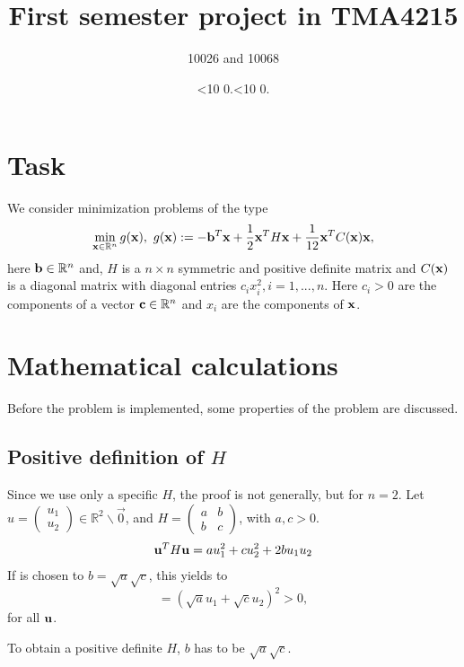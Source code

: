 \documentclass[a4paper,11pt]{article}
\newcommand{\leadingzero}[1]{\ifnum #1<10 0\the#1\else\the#1\fi}
\newcommand{\mytoday}{\leadingzero{\day}.\leadingzero{\month}.\the\year}
\begin{document}
\title{First semester project in TMA4215}
\author{10026 and 10068}
\date{\mytoday}
\maketitle


\section{Task}
We consider minimization problems of the type
\begin{align*}
\min_{{\bf x} \in \mathbb{R}^n} g({\bf x}),\,\, g({\bf x}):=-{\bf b}^T{\bf x} + \frac12{\bf x}^TH{\bf x}+\frac1{12}{\bf x}^TC({\bf x}){\bf x},
\end{align*}
here ${\bf b} \in \mathbb{R}^n$ and, $H$ is a $n \times n$ symmetric and positive definite matrix and $C(\bf{x})$ is a diagonal
matrix with diagonal entries $c_i x^2_i, i = 1, . . . , n$. 
Here $c_i > 0$ are the components of a vector ${\bf c} \in \mathbb{R}^n$ 
and $x_i$ are the components of $\bf{x}$. 

\section{Mathematical calculations}
Before the problem is implemented, some properties of the problem are discussed.
\subsection{Positive definition of $H$}\label{definit}
Since we use only a specific $H$, the proof is not generally, but for $n=2$.
Let $u=\begin{pmatrix}u_1\\u_2\end{pmatrix}\in \mathbb{R}^2\backslash \vec{0}$, and $H= \begin{pmatrix} a&b\\b&c\end{pmatrix}$, with $a,c>0$.
\begin{align*}
{\bf u}^TH{\bf u} = au_1^2 + cu_2^2 + 2 b u_1u_2
\end{align*}
If is chosen to $b = \sqrt{a}\sqrt{c}$, this yields to
$$ = (\sqrt{a}u_1+\sqrt{c}u_2)^2 >0,$$
for all ${\bf u}$.
 
To obtain a positive definite $H$, $b$ has to be $\sqrt{a}\sqrt{c}$.
\end{document}
